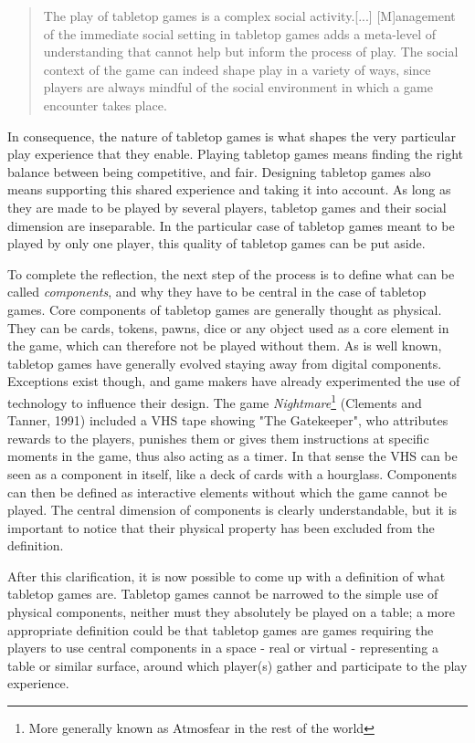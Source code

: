 \begin{quotation}
The play of tabletop games is a complex social activity.[...] [M]anagement of the immediate social setting in tabletop games adds a meta-level of understanding that cannot help but inform the process of play. The social context of the game can indeed shape play in a variety of ways, since players are always mindful of the social environment in which a game encounter takes place.
\end{quotation}
In consequence, the nature of tabletop games is what shapes the very particular play experience that they enable. Playing tabletop games means finding the right balance between being competitive, and fair. Designing tabletop games also means supporting this shared experience and taking it into account. As long as they are made to be played by several players, tabletop games and their social dimension are inseparable. In the particular case of tabletop games meant to be played by only one player, this quality of tabletop games can be put aside.

To complete the reflection, the next step of the process is to define what can be called \textit{components}, and why they have to be central in the case of tabletop games. Core components of tabletop games are generally thought as physical. They can be cards, tokens, pawns, dice or any object used as a core element in the game, which can therefore not be played without them. As is well known, tabletop games have generally evolved staying away from digital components. Exceptions exist though, and game makers have already experimented the use of technology to influence their design. The game \textit{Nightmare}\footnote{More generally known as Atmosfear in the rest of the world} (Clements and Tanner, 1991)\cite{game:atmo} included a VHS tape showing "The Gatekeeper", who attributes rewards to the players, punishes them or gives them instructions at specific moments in the game, thus also acting as a timer. In that sense the VHS can be seen as a component in itself, like a deck of cards with a hourglass.
Components can then be defined as interactive elements without which the game cannot be played. The central dimension of components is clearly understandable, but it is important to notice that their physical property has been excluded from the definition.

After this clarification, it is now possible to come up with a definition of what tabletop games are. Tabletop games cannot be narrowed to the simple use of physical components, neither must they absolutely be played on a table; a more appropriate definition could be that tabletop games are games requiring the players to use central components in a space - real or virtual - representing a table or similar surface, around which player(s) gather and participate to the play experience.
